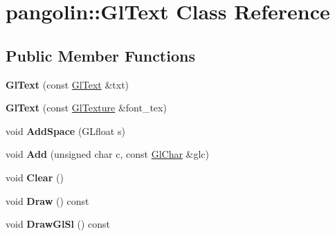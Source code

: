 \hypertarget{classpangolin_1_1_gl_text}{}\section{pangolin\+:\+:Gl\+Text Class Reference}
\label{classpangolin_1_1_gl_text}
\subsection*{Public Member Functions}
\begin{DoxyCompactItemize}
\item 
{\bfseries Gl\+Text} (const \hyperlink{classpangolin_1_1_gl_text}{Gl\+Text} \&txt)\hypertarget{classpangolin_1_1_gl_text_a7da26b24cb14123c130e11e5bb3e96a9}{}\label{classpangolin_1_1_gl_text_a7da26b24cb14123c130e11e5bb3e96a9}

\item 
{\bfseries Gl\+Text} (const \hyperlink{classpangolin_1_1_gl_texture}{Gl\+Texture} \&font\+\_\+tex)\hypertarget{classpangolin_1_1_gl_text_a4a719f2d9cdb7ab78f3d55b59b87a973}{}\label{classpangolin_1_1_gl_text_a4a719f2d9cdb7ab78f3d55b59b87a973}

\item 
void {\bfseries Add\+Space} (G\+Lfloat s)\hypertarget{classpangolin_1_1_gl_text_a585e5c17349f04fbc35acbcc6ec4f97b}{}\label{classpangolin_1_1_gl_text_a585e5c17349f04fbc35acbcc6ec4f97b}

\item 
void {\bfseries Add} (unsigned char c, const \hyperlink{classpangolin_1_1_gl_char}{Gl\+Char} \&glc)\hypertarget{classpangolin_1_1_gl_text_a8568901ba44b67c2a524390faa185101}{}\label{classpangolin_1_1_gl_text_a8568901ba44b67c2a524390faa185101}

\item 
void {\bfseries Clear} ()\hypertarget{classpangolin_1_1_gl_text_a63db7d32f57a88fc2c2acaaa47b56e0f}{}\label{classpangolin_1_1_gl_text_a63db7d32f57a88fc2c2acaaa47b56e0f}

\item 
void {\bfseries Draw} () const \hypertarget{classpangolin_1_1_gl_text_a3de9dc9caf9196a4b76674a70b585ebf}{}\label{classpangolin_1_1_gl_text_a3de9dc9caf9196a4b76674a70b585ebf}

\item 
void {\bfseries Draw\+Gl\+Sl} () const \hypertarget{classpangolin_1_1_gl_text_ad0d8fe41c8edbe93032d38e3f73a59c6}{}\label{classpangolin_1_1_gl_text_ad0d8fe41c8edbe93032d38e3f73a59c6}


\end{DoxyCompactItemize}
